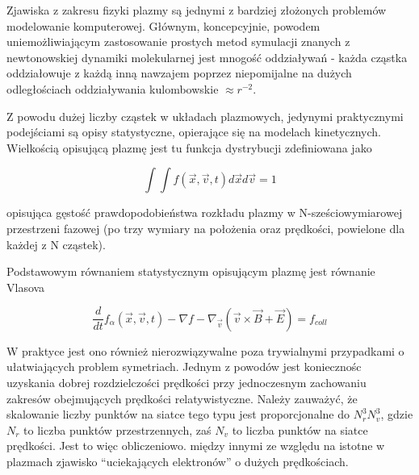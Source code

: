     Zjawiska z zakresu fizyki plazmy są jednymi z bardziej złożonych problemów modelowanie komputerowej.
    Głównym, koncepcyjnie, powodem uniemożliwiającym zastosowanie prostych metod symulacji
    znanych z newtonowskiej dynamiki molekularnej jest mnogość oddziaływań - każda cząstka oddziałowuje
    z każdą inną nawzajem poprzez niepomijalne na dużych odległościach oddziaływania kulombowskie $\approx r^{-2}$.

    Z powodu dużej liczby cząstek w układach plazmowych, jedynymi praktycznymi podejściami są opisy statystyczne,
    opierające się na modelach kinetycznych. Wielkością opisującą plazmę jest tu funkcja dystrybucji zdefiniowana jako


    \begin{equation}
        \int \int f(\vec{x}, \vec{v}, t) d\vec{x} d\vec{v} = 1 %
        \label{eqn:distribution-function}
    \end{equation}


    opisująca gęstość prawdopodobieństwa rozkładu plazmy w N-sześciowymiarowej przestrzeni fazowej (po trzy wymiary na położenia
    oraz prędkości, powielone dla każdej z N cząstek).


    Podstawowym równaniem statystycznym opisującym plazmę jest równanie Vlasova %

    \begin{equation}
        \frac{ d} {dt} f_{\alpha} (\vec{x}, \vec{v}, t) - \nabla f - \nabla_{\vec{v}} (\vec{v} \times \vec{B} + \vec{E})= f_{coll}
        \label{eqn:Vlasov}
    \end{equation}

    W praktyce jest ono również nierozwiązywalne poza trywialnymi przypadkami o ułatwiających problem symetriach.
    Jednym z powodów jest koniecznośc uzyskania dobrej rozdzielczości prędkości
    przy jednoczesnym zachowaniu zakresów obejmujących prędkości relatywistyczne. Należy zauważyć, że skalowanie
    liczby punktów na siatce tego typu jest proporcjonalne do $N_r^3 N_v^3$, gdzie $N_r$ to liczba punktów przestrzennych, zaś
    $N_v$ to liczba punktów na siatce prędkości. Jest to więc %
    obliczeniowo. %
    między innymi ze względu na istotne w plazmach zjawisko ``uciekających elektronów'' o dużych prędkościach.

